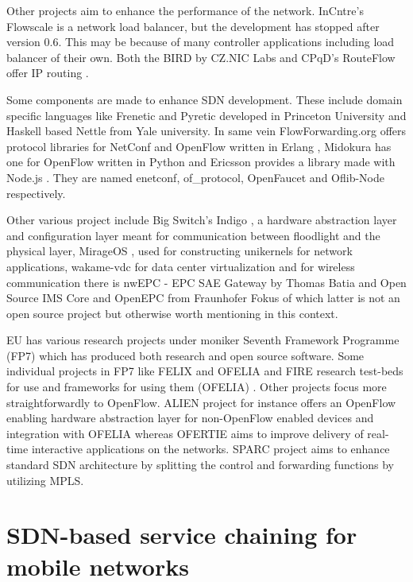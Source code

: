 \documentclass[english]{tktltiki2}
\theoremstyle{definition}
\theoremstyle{remark}
\begin{document}
Other projects aim to enhance the performance of the network. InCntre’s Flowscale \cite{Flowscale} is a network load balancer, but the development has stopped after version 0.6. This may be because of many controller applications including load balancer of their own. Both the BIRD by CZ.NIC Labs and CPqD’s RouteFlow offer IP routing \cite{Bird, RouteFlow}.

Some components are made to enhance SDN development. These include domain specific languages like Frenetic and Pyretic developed in Princeton University \cite{Frenetic} and Haskell based Nettle \cite{Nettle} from Yale university. In same vein FlowForwarding.org offers protocol libraries for NetConf and OpenFlow written in Erlang \cite{enetconf,ofproto}, Midokura has one for OpenFlow written in Python \cite{OpenFaucet} and Ericsson provides a library made with Node.js \cite{Node}. They are named enetconf, of\_protocol, OpenFaucet and Oflib-Node respectively. 

Other various project include Big Switch’s Indigo \cite{Indigo}, a hardware abstraction layer and configuration layer meant for communication between floodlight and the physical layer, MirageOS \cite{Mirage}, used for constructing unikernels for network applications, wakame-vdc for data center virtualization \cite{wakame} and for wireless communication there is nwEPC - EPC SAE Gateway by Thomas Batia \cite{nwEPC} and Open Source IMS Core and OpenEPC from Fraunhofer Fokus \cite{IMSCORE, OpenEPC} of which latter is not an open source project but otherwise worth mentioning in this context. 

EU has various research projects under moniker Seventh Framework Programme (FP7) \cite{FP7} which has produced both research and open source software. Some individual projects in FP7 like FELIX and OFELIA and FIRE research test-beds for use and frameworks for using them (OFELIA) \cite{FELIX, OFELIA, FIRE}. Other projects focus more straightforwardly to OpenFlow. ALIEN project \cite{ALIEN} for instance offers an OpenFlow enabling hardware abstraction layer for non-OpenFlow enabled devices and integration with OFELIA whereas OFERTIE \cite{OFERTIE} aims to improve delivery of real-time interactive applications on the networks. SPARC \cite{SPARC} project aims to enhance standard SDN architecture by splitting the control and forwarding functions by utilizing MPLS.

\clearpage

\section{SDN-based service chaining for mobile networks}
\end{document}
